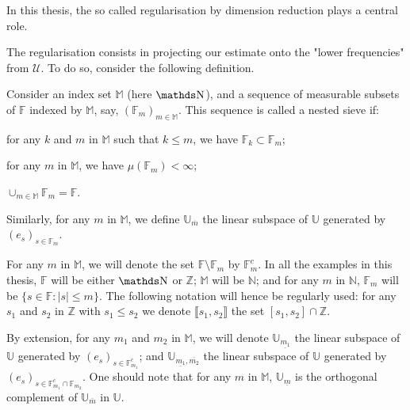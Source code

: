 In this thesis, the so called regularisation by dimension reduction plays a central role.

The regularisation consists in projecting our estimate onto the "lower frequencies" from $\mathcal{U}$.
To do so, consider the following definition.

\begin{de}
Consider an index set $\mathds{M}$ (here $\N$), and a sequence of measurable subsets of $\mathds{F}$ indexed by $\mathds{M}$, say, $(\mathds{F}_{m})_{m \in \mathds{M}}$.
This sequence is called a nested sieve if:
\item[\mylabel{BACKGROUND_REGULARISATION_NESTEDSIEVE_i}{\dgrau{\bfseries{i: }}}] for any $k$ and $m$  in $\mathds{M}$ such that $k \leq m$, we have $\mathds{F}_{k} \subset \mathds{F}_{m}$;
\item[\mylabel{BACKGROUND_REGULARISATION_NESTEDSIEVE_ii}{\dgrau{\bfseries{ii: }}}] for any $m$ in $\mathds{M}$, we have $\mu(\mathds{F}_{m}) < \infty$;
\item[\mylabel{BACKGROUND_REGULARISATION_NESTEDSIEVE_iii}{\dgrau{\bfseries{iii: }}}] $\cup_{m \in \mathds{M}} \mathds{F}_{m} = \mathds{F}$.
\assEnd
\end{de}

Similarly, for any $m$ in $\mathds{M}$, we define $\mathds{U}_{\overline{m}}$ the linear subspace of $\mathds{U}$ generated by $(e_{s})_{s \in \mathds{F}_{m}}$.

For any $m$ in $\mathds{M}$, we will denote  the set $\mathds{F} \setminus \mathds{F}_{m}$ by $\mathds{F}_{m}^{c}$.
In all the examples in this thesis, $\mathds{F}$ will be either $\N$ or $\mathds{Z}$; $\mathds{M}$ will be $\mathds{N}$; and for any $m$ in $\mathds{N}$, $\mathds{F}_{m}$ will be $\{s \in \mathds{F}: \vert s \vert \leq m \}$.
The following notation will hence be regularly used: for any $s_{1}$ and $s_{2}$ in $\mathds{Z}$ with $s_{1} \leq s_{2}$ we denote $\llbracket s_{1}, s_{2} \rrbracket$ the set $[s_{1}, s_{2}] \cap \mathds{Z}$.

By extension, for any $m_{1}$ and $m_{2}$ in $\mathds{M}$, we will denote $\mathds{U}_{\underline{m_{1}}}$ the linear subspace of $\mathds{U}$ generated by $(e_{s})_{s \in \mathds{F}_{m_{1}}^{c}}$; and $\mathds{U}_{\underline{m_{1}}, \overline{m_{2}}}$ the linear subspace of $\mathds{U}$ generated by $(e_{s})_{s \in \mathds{F}_{m_{1}}^{c} \cap \mathds{F}_{m_{2}}}$.
One should note that for any $m$ in $\mathds{M}$, $\mathds{U}_{\underline{m}}$ is the orthogonal complement of $\mathds{U}_{\overline{m}}$ in $\mathds{U}$.

